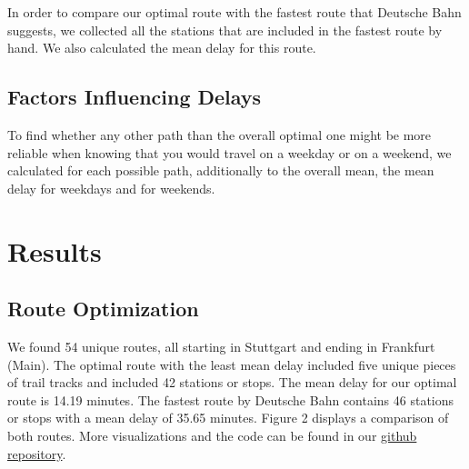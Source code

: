 \documentclass{article}
\theoremstyle{plain}
\theoremstyle{definition}
\theoremstyle{remark}
\begin{document}
In order to compare our optimal route with the fastest route that Deutsche Bahn suggests, we collected all the stations that are included in the fastest route by hand. We also calculated the mean delay for this route.

\subsection{Factors Influencing Delays}\label{sec:methods_ext}

To find whether any other path than the overall optimal one might be more 
reliable when knowing that you would travel on a weekday or on a weekend, we
calculated for each possible path, additionally to the overall mean, the mean 
delay for weekdays and for weekends. 

%

\section{Results}\label{sec:results}

\subsection{Route Optimization}\label{sec:results_route}

We found 54 unique routes, all starting in Stuttgart and ending in Frankfurt (Main). The optimal route with the least mean delay included five unique pieces of trail tracks and included 42 stations or stops. The mean delay for our optimal route is 14.19 minutes. The fastest route by Deutsche Bahn contains 46 stations or stops with a mean delay of 35.65 minutes. Figure 2 displays a comparison of both routes. More visualizations and the code can be found in our \href{https://github.com/frederikpanse/db_project}{github repository}.
\end{document}
